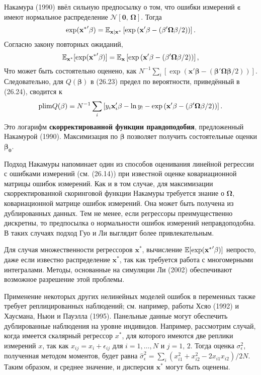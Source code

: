 Накамура (1990) ввёл сильную предпосылку о том, что ошибки измерений $\mathbf{\varepsilon}$ имеют нормальное распределение $\mathcal{N}[\mathbf{0}, \, \mathbf{\Omega}]$. Тогда
\[
\exp (\mathbf{x^*}' \mathbf{\beta}) = \mathbb{E}_{\mathbf{x|x^*}} \left[ \exp \left(\mathbf{x}' \mathbf{\beta} - (\mathbf{\beta' \Omega \beta} /2) \right) \right].
\]
Согласно закону повторных ожиданий,
\[
\mathbb{E}_{\mathbf{x^*}} [\exp (\mathbf{x^*}' \mathbf{\beta})] = \mathbb{E}_{\mathbf{x}} \left[ \exp \left(\mathbf{x}' \mathbf{\beta} - (\mathbf{\beta' \Omega \beta} /2) \right) \right],
\]
Что может быть состоятельно оценено, как $N^{-1} \sum \limits_i [ \exp (\mathbf{x}' \mathbf{\beta} - (\mathbf{\beta' \Omega \beta} /2) )]$. Следовательно, для $Q(\mathbf{\beta})$ в (26.23) предел по вероятности, приведённый в (26.24), сводится к
\[
\mathrm{plim } Q(\mathbf{\beta}) = N^{-1} \sum \limits_i \left[ y_i \mathbf{x}'_i \mathbf{\beta} - \ln y_! - \exp \left(\mathbf{x}' \mathbf{\beta} - (\mathbf{\beta' \Omega \beta} /2) \right) \right].
\]
Это логарифм {\bf скорректированной функции правдоподобия}, предложенный Накамурой (1990). Максимизация по $\mathbf{\beta}$ позволяет получить состоятельные оценки $\mathbf{\beta_0}$.

Подход Накамуры  напоминает один из способов оценивания линейной регрессии с ошибками измерений (см. (26.14)) при известной оценке ковариационной матрицы ошибок измерений. Как и в том случае, для максимизации скорректированной скоринговой функции Накамуры требуется знание о $\mathbf{\Omega}$, ковариационной матрице ошибок измерений. Она может быть получена из дублированных данных. Тем не менее, если регрессоры преимущественно дискретны, то предпосылка о нормальности ошибок измерений неправдоподобна. В таких случаях подход Гуо и Ли выглядит более привлекательным.

Для случая множественности регрессоров $\mathbf{x^*}$, вычисление $\mathbb{E} [\exp (\mathbf{x^*}' \mathbf{\beta})]$ непросто, даже если известно распределение $\mathbf{x^*}$, так как требуется работа с многомерными интегралами. Методы, основанные на симуляции Ли (2002) обеспечивают возможное разрешение этой проблемы.

Применение некоторых других нелинейных моделей ошибок в переменных также требует реплицированных наблюдений; см. например, работы Хсяо (1992) и Хаусмана, Ньюи и Пауэлла (1995). Панельные данные могут обеспечить дублированные наблюдения на уровне индивидов. Например, рассмотрим случай, когда имеется скалярный регрессор $x^*$, для которого имеются две реплики измерений $x$, так как $x_{ij} = x_i + \epsilon_{ij}$ для $i=1,\dots,N$ и $j=1, \, 2$. Тогда оценка $\sigma^2_{\epsilon}$, полученная методом моментов, будет равна $\widehat{\sigma}^2_{\epsilon} = \sum \limits_i (x^2_{i1}+x^2_{i2} - 2x_{i1}x_{i2})/2N$. Таким образом, и среднее значение, и дисперсия $\mathbf{x^*}$ могут быть оценены.
 

